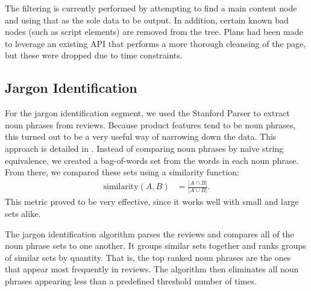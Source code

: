 \documentclass{article}
\begin{document}
The filtering is currently performed by attempting to find a main content node
and using that as the sole data to be output. In addition, certain known bad
nodes (such as script elements) are removed from the tree. Plans had been made
to leverage an existing API that performs a more thorough cleansing of the page,
but these were dropped due to time constraints.



\subsection{Jargon Identification} %

For the jargon identification segment, we used the Stanford Parser to extract noun phrases from reviews.  Because product features tend to be noun phrases, this turned out to be a very useful way of narrowing down the data.  This approach is detailed in \cite{opine}.  Instead of comparing noun phrases by na\"ive string equivalence, we created a bag-of-words set from the words in each noun phrase.  From there, we compared these sets using a similarity function:\begin{align*}
	\text{similarity}(A,B) &= \frac{|A\cap B|}{|A\cup B|}.
\end{align*}  This metric proved to be very effective, since it works well with small and large sets alike.

The jargon identification algorithm parses the reviews and compares all of the noun phrase sets to one another.  It groups similar sets together and ranks groups of similar sets by quantity.  That is, the top ranked noun phrases are the ones that appear most frequently in reviews.  The algorithm then eliminates all noun phrases appearing less than a predefined threshold number of times.
\end{document}
